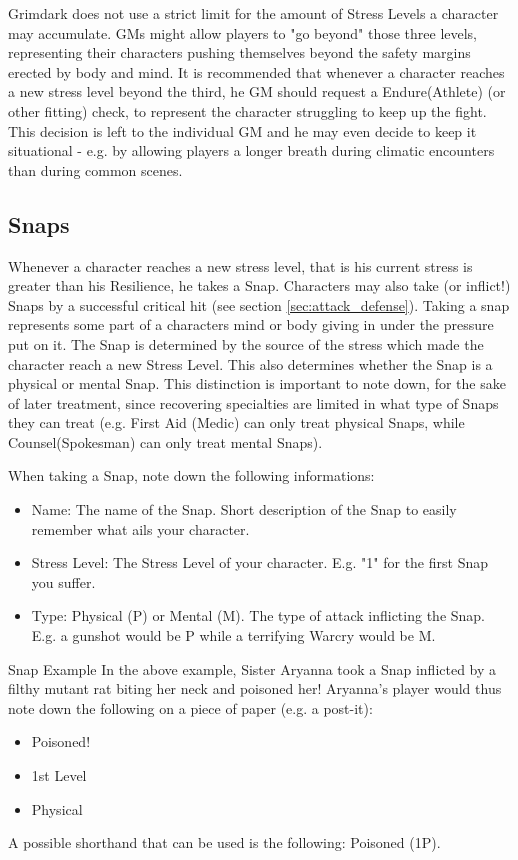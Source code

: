 	Grimdark does not use a strict limit for the amount of Stress Levels a character may accumulate.
	GMs might allow players to "go beyond" those three levels, representing their characters pushing themselves beyond the safety margins erected by body and mind.
	It is recommended that whenever a character reaches a new stress level beyond the third, he GM should request a Endure(Athlete) (or other fitting) check, to represent the character struggling to keep up the fight.\\
	This decision is left to the individual GM and he may even decide to keep it situational - e.g. by allowing players a longer breath during climatic encounters than during common scenes.

\subsection{Snaps} %
	\label{sub:snap}
	Whenever a character reaches a new stress level, that is his current stress is greater than his Resilience, he takes a Snap.
	Characters may also take (or inflict!) Snaps by a successful critical hit (see section \ref{sec:attack_defense}).
	Taking a snap represents some part of a characters mind or body giving in under the pressure put on it.
	The Snap is determined by the source of the stress which made the character reach a new Stress Level. 
	This also determines whether the Snap is a physical or mental Snap. 
	This distinction is important to note down, for the sake of later treatment, since recovering specialties are limited in what type of Snaps they can treat (e.g. First Aid (Medic) can only treat physical Snaps, while Counsel(Spokesman) can only treat mental Snaps).

	When taking a Snap, note down the following informations:
	\begin{itemize}
		\item Name: The name of the Snap. Short description of the Snap to easily remember what ails your character.
		\item Stress Level: The Stress Level of your character. E.g. "1" for the first Snap you suffer.
		\item Type: Physical (P) or Mental (M). The type of attack inflicting the Snap. E.g. a gunshot would be P while a terrifying Warcry would be M.
	\end{itemize}


	\begin{DndSidebar}{Snap Example}
	In the above example, Sister Aryanna took a Snap inflicted by a filthy mutant rat biting her neck and poisoned her!
	Aryanna's player would thus note down the following on a piece of paper (e.g. a post-it):
	\begin{itemize}
		\item Poisoned!
		\item 1st Level
		\item Physical
	\end{itemize}	A possible shorthand that can be used is the following: Poisoned (1P).
	\end{DndSidebar}


